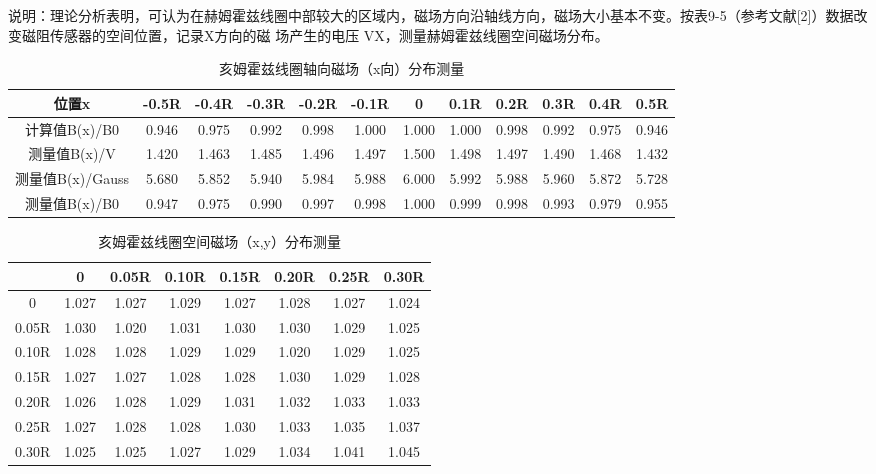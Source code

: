 \documentclass[dvipsnames, svgnames,a4paper,11pt]{article}
\begin{document}
\begin{enumerate}
		说明：理论分析表明，可认为在赫姆霍兹线圈中部较大的区域内，磁场方向沿轴线方向，磁场大小基本不变。按表9-5（参考文献[2]）数据改变磁阻传感器的空间位置，记录X方向的磁 场产生的电压 VX，测量赫姆霍兹线圈空间磁场分布。
		
		\begin{table}[h]
			\centering
			\caption{亥姆霍兹线圈轴向磁场（x向）分布测量}
			\label{tab:tab3}
			\begin{tabular}{|c|c|c|c|c|c|c|c|c|c|c|c|}
				\hline
				位置x & -0.5R & -0.4R & -0.3R & -0.2R & -0.1R & 0 & 0.1R & 0.2R & 0.3R & 0.4R & 0.5R \\
				\hline
				计算值B(x)/B0 & 0.946 & 0.975 & 0.992 & 0.998 & 1.000 & 1.000 & 1.000 & 0.998 & 0.992 & 0.975 & 0.946 \\
				测量值B(x)/V & 1.420 & 1.463 & 1.485 & 1.496 & 1.497 & 1.500 & 1.498 & 1.497 & 1.490 & 1.468 & 1.432 \\
				测量值B(x)/Gauss & 5.680 & 5.852 & 5.940 & 5.984 & 5.988 & 6.000 & 5.992 & 5.988 & 5.960 & 5.872 & 5.728 \\
				测量值B(x)/B0 & 0.947 & 0.975 & 0.990 & 0.997 & 0.998 & 1.000 & 0.999 & 0.998 & 0.993 & 0.979 & 0.955 \\
				\hline
			\end{tabular}
		\end{table}
		
		\begin{table}[h]
			\centering
			\caption{亥姆霍兹线圈空间磁场（x,y）分布测量}
			\label{tab:tab4}
			\begin{tabular}{|c|ccccccc|}
				\hline
				\diagbox{Y}{$U_x/V$}{X} & 0 & 0.05R & 0.10R & 0.15R & 0.20R & 0.25R & 0.30R \\
				\hline
				0 & 1.027 & 1.027 & 1.029 & 1.027 & 1.028 & 1.027 & 1.024 \\
				0.05R & 1.030 & 1.020 & 1.031 & 1.030 & 1.030 & 1.029 & 1.025 \\
				0.10R & 1.028 & 1.028 & 1.029 & 1.029 & 1.020 & 1.029 & 1.025 \\
				0.15R & 1.027 & 1.027 & 1.028 & 1.028 & 1.030 & 1.029 & 1.028 \\
				0.20R & 1.026 & 1.028 & 1.029 & 1.031 & 1.032 & 1.033 & 1.033 \\
				0.25R & 1.027 & 1.028 & 1.028 & 1.030 & 1.033 & 1.035 & 1.037 \\
				0.30R & 1.025 & 1.025 & 1.027 & 1.029 & 1.034 & 1.041 & 1.045 \\
				\hline
			\end{tabular}
		\end{table}
				

\end{enumerate}
\end{document}

